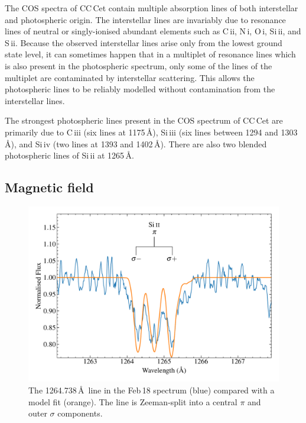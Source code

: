 \documentclass[fleqn,usenatbib]{mnras}
\begin{document}
The COS spectra of CC\,Cet contain multiple absorption lines of both interstellar and photospheric origin. The interstellar lines are invariably due to resonance lines of neutral or singly-ionised abundant elements such as C\,{\sc ii}, N\,{\sc i}, O\,{\sc i}, Si\,{\sc ii}, and S\,{\sc ii}. Because the observed interstellar lines arise only from the lowest ground state level, it can sometimes happen that in a multiplet of resonance lines which is also present in the photospheric spectrum, only some of the lines of the multiplet are contaminated by interstellar scattering. This allows the photospheric lines to be reliably modelled without contamination from the interstellar lines. 

The strongest photospheric lines present in the COS spectrum of CC\,Cet are primarily due to C\,{\sc iii} (six lines at 1175\,\AA), Si\,{\sc iii} (six lines between 1294 and 1303\,\AA), and Si\,{\sc iv} (two lines at 1393 and 1402\,\AA). There are also two blended photospheric lines of Si\,{\sc ii} at 1265\,\AA. 


\subsection{Magnetic field}


\begin{figure}
    \centering
    \includegraphics[width=8 cm]{siii_lines.pdf}
    \caption{The  1264.738\,\AA\ line in the Feb\,18 spectrum (blue) compared with a model fit (orange). The line is Zeeman-split into a central $\pi$ and outer $\sigma$ components.}
    \label{fig:siii_lines}
\end{figure}
\end{document}
